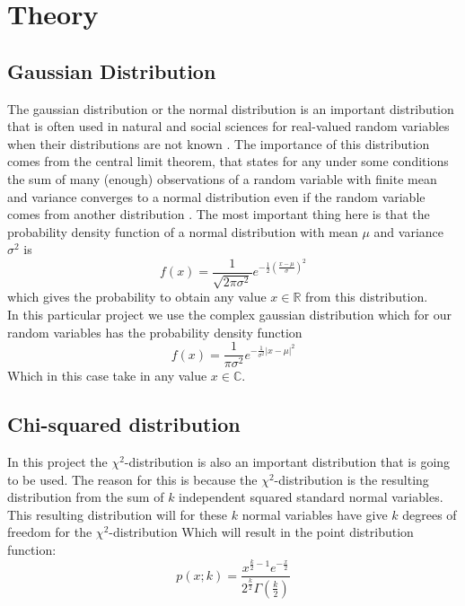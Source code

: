 \section{Theory}\label{sec:theory}
\subsection{Gaussian Distribution}
The gaussian distribution or the normal distribution is an important distribution that is often used in natural and social sciences for real-valued random variables when their distributions are not known \cite{WikipediaGaussian}. The importance of this distribution comes from the central limit theorem, that states for any under some conditions the sum of many (enough) observations of a random variable with finite mean and variance converges to a normal distribution even if the random variable comes from another distribution  \cite{WikipediaCLT}. The most important thing here is that the probability density function of a normal distribution with mean $\mu$ and variance $\sigma^2$ is
\begin{equation}
	f(x) = \frac{1}{\sqrt{2\pi\sigma^2}}e^{-\frac{1}{2}(\frac{x-\mu}{\sigma})^2}
\end{equation}
which gives the probability to obtain any value $x\in\mathbb{R}$ from this distribution.\\
In this particular project we use the complex gaussian distribution which for our random variables has the probability density function
\begin{equation}
	f(x) = \frac{1}{\pi\sigma^2}e^{-\frac{1}{\sigma^2}|x-\mu|^2}
\end{equation}
Which in this case take in any value $x\in\mathbb{C}$.

\subsection{Chi-squared distribution}
In this project the $\chi^2$-distribution is also an important distribution that is going to be used. The reason for this is because the $\chi^2$-distribution is the resulting distribution from the sum of $k$ independent squared standard normal variables. This resulting distribution will for these $k$ normal variables have give $k$ degrees of freedom for the $\chi^2$-distribution \cite{WikipediaChi} Which will result in the point distribution function:
\begin{equation}
    p(x; k) = \frac{x^{\frac{k}{2}-1}e^{-\frac{x}{2}}}{2^{\frac{k}{2}}\Gamma(\frac{k}{2})}
\end{equation}

